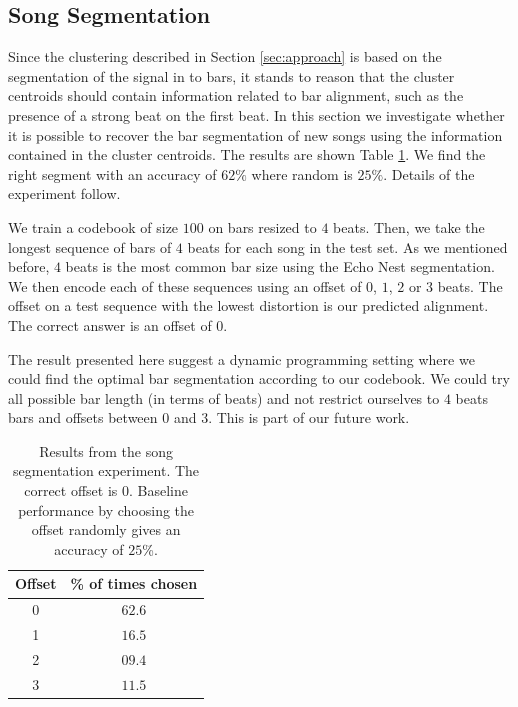 \documentclass{article}
\begin{document}

\subsection{Song Segmentation} \label{ssec:segment}

Since the clustering described in Section \ref{sec:approach} is based
on the segmentation of the signal in to bars, it stands to reason that
the cluster centroids should contain information related to bar
alignment, such as the presence of a strong beat on the first beat.
%
In this section we investigate whether it is possible to recover the
bar segmentation of new songs using the information contained in the
cluster centroids.  The results are shown Table \ref{tab:offset}. We find
the right segment with an accuracy of $62\%$ where random is
$25\%$. Details of the experiment follow.

We train a codebook of size $100$ on bars resized to $4$ beats. Then,
we take the longest sequence of bars of $4$ beats for each song
in the test set.  As
we mentioned before, $4$ beats is the most common bar size using the
Echo Nest segmentation. We then encode each of these sequences using an offset
of $0$, $1$, $2$ or $3$ beats. The offset on a test sequence
with the lowest distortion is our predicted alignment.
The correct answer is an offset of $0$.


The result presented here suggest a dynamic programming setting where
we could find the optimal bar segmentation according to our codebook. 
We could try
all possible bar length (in terms of beats) and not restrict ourselves
to $4$ beats bars and offsets between $0$ and $3$. This is part of
our future work.

\begin{table}
\begin{center}
\begin{tabular}{cc}
\toprule
Offset & \% of times chosen \\
\midrule
0 & $\mathbf{62.6}$\\
1 & $16.5$\\
2 & $09.4$\\
3 & $11.5$\\
\bottomrule
\end{tabular}
\end{center}
\caption{\small{
Results from the song segmentation experiment.
The correct offset is $0$.
Baseline performance by choosing the offset randomly gives an accuracy of $25$\%.
}}
\label{tab:offset}
\end{table}
\end{document}
